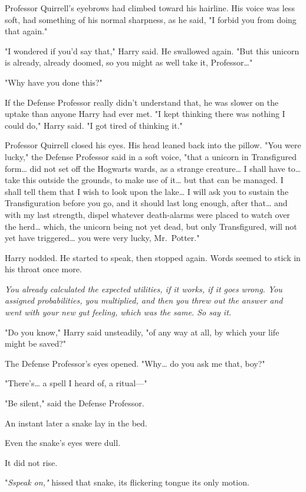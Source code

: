 Professor Quirrell's eyebrows had climbed toward his hairline. His voice was less soft, had something of his normal sharpness, as he said, "I forbid you from doing that again."

"I wondered if you'd say that," Harry said. He swallowed again. "But this unicorn is already, already doomed, so you might as well take it, Professor{\ldots}"

"Why have you done this?"

If the Defense Professor really didn't understand that, he was slower on the uptake than anyone Harry had ever met. "I kept thinking there was nothing I could do," Harry said. "I got tired of thinking it."

Professor Quirrell closed his eyes. His head leaned back into the pillow. "You were lucky," the Defense Professor said in a soft voice, "that a unicorn in Transfigured form{\ldots} did not set off the Hogwarts wards, as a strange creature{\ldots} I shall have to{\ldots} take this outside the grounds, to make use of it{\ldots} but that can be managed. I shall tell them that I wish to look upon the lake{\ldots} I will ask you to sustain the Transfiguration before you go, and it should last long enough, after that{\ldots} and with my last strength, dispel whatever death-alarms were placed to watch over the herd{\ldots} which, the unicorn being not yet dead, but only Transfigured, will not yet have triggered{\ldots} you were very lucky, Mr.~Potter."

Harry nodded. He started to speak, then stopped again. Words seemed to stick in his throat once more.

\emph{You already calculated the expected utilities, if it works, if it goes wrong. You assigned probabilities, you multiplied, and then you threw out the answer and went with your new gut feeling, which was the same. So say it.}

"Do you know," Harry said unsteadily, "of any way at all, by which your life might be saved?"

The Defense Professor's eyes opened. "Why{\ldots} do you ask me that, boy?"

"There's{\ldots} a spell I heard of, a ritual---"

"Be silent," said the Defense Professor.

An instant later a snake lay in the bed.

Even the snake's eyes were dull.

It did not rise.

"\emph{Sspeak on,"} hissed that snake, its flickering tongue its only motion.

